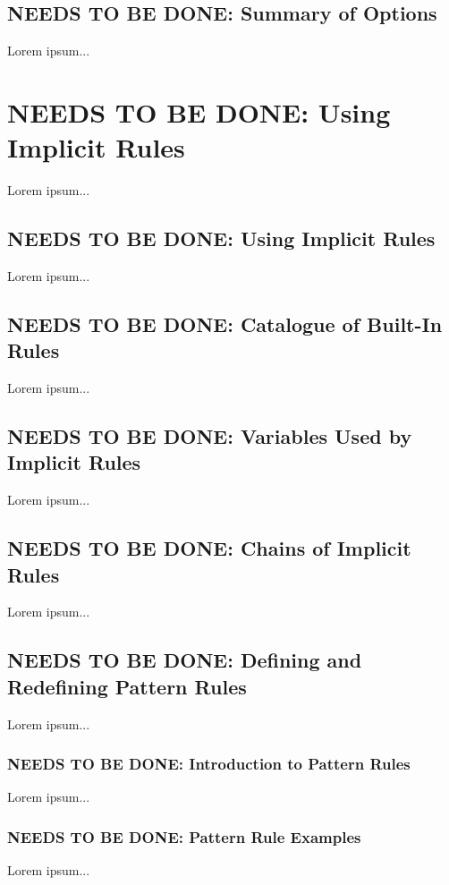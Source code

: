 \documentclass{charun}
\begin{document}
\begin{multicols*}{2}
\color{gray}
\subsection{NEEDS TO BE DONE: Summary of Options}
Lorem ipsum...
\color{black}


\color{gray}
\section{NEEDS TO BE DONE: Using Implicit Rules}
Lorem ipsum...
\color{black}


\color{gray}
\subsection{NEEDS TO BE DONE: Using Implicit Rules}
Lorem ipsum...
\color{black}

\color{gray}
\subsection{NEEDS TO BE DONE: Catalogue of Built-In Rules}
Lorem ipsum...
\color{black}

\color{gray}
\subsection{NEEDS TO BE DONE: Variables Used by Implicit Rules}
Lorem ipsum...
\color{black}

\color{gray}
\subsection{NEEDS TO BE DONE: Chains of Implicit Rules}
Lorem ipsum...
\color{black}

\color{gray}
\subsection{NEEDS TO BE DONE: Defining and Redefining Pattern Rules}
Lorem ipsum...
\color{black}

\color{gray}
\subsubsection{NEEDS TO BE DONE: Introduction to Pattern Rules}
Lorem ipsum...
\color{black}

\color{gray}
\subsubsection{NEEDS TO BE DONE: Pattern Rule Examples}
Lorem ipsum...
\color{black}


\end{multicols*}
\end{document}

